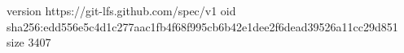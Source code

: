 version https://git-lfs.github.com/spec/v1
oid sha256:edd556e5c4d1c277aac1fb4f68f995cb6b42e1dee2f6dead39526a11cc29d851
size 3407
